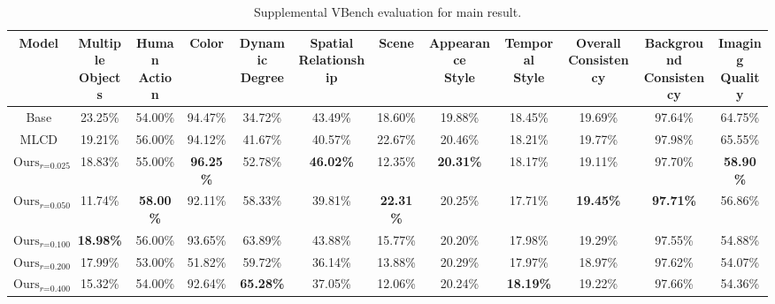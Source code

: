 \begin{table*}[h]
\scriptsize \centering
\setlength{\tabcolsep}{4pt}
\caption{Supplemental VBench evaluation for main result.} 
\begin{tabular}{cccccccccccc}
\toprule 
\textbf{Model} & \makecell{\textbf{Multiple} \\ \textbf{Objects}} & \makecell{\textbf{Human} \\ \textbf{Action}} & \textbf{Color} & \makecell{\textbf{Dynamic} \\ \textbf{Degree}} & \makecell{\textbf{Spatial} \\ \textbf{Relationship}} & \textbf{Scene} & \makecell{\textbf{Appearance} \\ \textbf{Style}} & \makecell{\textbf{Temporal} \\ \textbf{Style}} & \makecell{\textbf{Overall} \\ \textbf{Consistency}} & \makecell{\textbf{Background} \\ \textbf{Consistency}} & \makecell{\textbf{Imaging} \\ \textbf{Quality}} \\
\midrule
Base & 23.25\% & 54.00\% & 94.47\% & 34.72\% & 43.49\% & 18.60\% & 19.88\% & 18.45\% & 19.69\% & 97.64\% & 64.75\% \\ 
MLCD & 19.21\% & 56.00\% & 94.12\% & 41.67\% & 40.57\% & 22.67\% & 20.46\% & 18.21\% & 19.77\% & 97.98\% & 65.55\% \\ 
\midrule
$\text{Ours}_{r\text{=0.025}}$ & 18.83\% & 55.00\% & \textbf{96.25\%} & 52.78\% & \textbf{46.02\%} & 12.35\% & \textbf{20.31\%} & 18.17\% & 19.11\% & 97.70\% & \textbf{58.90\%} \\ 
$\text{Ours}_{r\text{=0.050}}$ & 11.74\% & \textbf{58.00\%} & 92.11\% & 58.33\% & 39.81\% & \textbf{22.31\%} & 20.25\% & 17.71\% & \textbf{19.45\%} & \textbf{97.71\%} & 56.86\% \\ 
$\text{Ours}_{r\text{=0.100}}$ & \textbf{18.98\%} & 56.00\% & 93.65\% & 63.89\% & 43.88\% & 15.77\% & 20.20\% & 17.98\% & 19.29\% & 97.55\% & 54.88\% \\ 
$\text{Ours}_{r\text{=0.200}}$ & 17.99\% & 53.00\% & 51.82\% & 59.72\% & 36.14\% & 13.88\% & 20.29\% & 17.97\% & 18.97\% & 97.62\% & 54.07\% \\ 
$\text{Ours}_{r\text{=0.400}}$ & 15.32\% & 54.00\% & 92.64\% & \textbf{65.28\%} & 37.05\% & 12.06\% & 20.24\% & \textbf{18.19\%} & 19.22\% & 97.66\% & 54.36\% \\ 
\bottomrule
\end{tabular}
\label{tab::all_vbench}
\end{table*}


